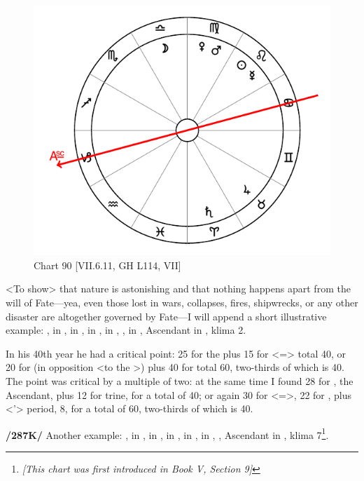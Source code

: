 \begin{figure}
\centering
\vspace{0pt}
\includegraphics[width=.68\textwidth]{charts/7_6_11}
\caption{Chart 90 [VII.6.11, GH L114, VII] }
\label{fig:chart90}
\end{figure} 

<To show> that nature is astonishing and that nothing happens apart from the will of Fate—yea, even those lost in wars, collapses, fires, shipwrecks, or any other disaster are altogether governed by Fate—I will append a short illustrative example: \Sun, \Mercury\xspace in \Leo, \Moon\xspace in \Libra, \Saturn\xspace in \Aries, \Jupiter\xspace in \Taurus, \Mars, \Venus\xspace in \Virgo, Ascendant in \Capricorn, klima 2. 

In his 40th year he had a critical point: 25 for the \Moon\xspace plus 15 for \Aries\xspace <=\Mars> total 40, or 20 for \Aries\xspace (in opposition <to the \Moon>) plus 40 for \Libra\xspace total 60, two-thirds of which is 40. The point was critical by a multiple of two: at the same time I found 28 for \Capricorn, the Ascendant, plus 12 for \Jupiter trine, for a total of 40; or again 30 for \Capricorn\xspace <=\Saturn>, 22 for \Taurus, plus <\Venus’> period, 8, for a total of 60, two-thirds of which is 40.

\textbf{/287K/} Another example: \Sun, \Mercury\xspace in \Aquarius, \Moon\xspace in \Scorpio, \Saturn\xspace in \Cancer, \Jupiter\xspace in \Libra, \Venus\xspace in \Capricorn, \Mars, Ascendant in \Virgo, klima 7\footnote{\textit{[This chart was first introduced in Book V, Section 9]}}.

